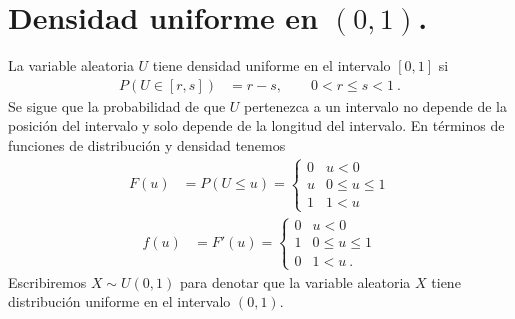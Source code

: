 \documentclass[12pt,reqno]{amsart}\usepackage[]{graphicx}\usepackage[]{color}
\begin{document}
\section{Densidad uniforme en $(0,1)$.}
La variable aleatoria $U$ tiene densidad uniforme en el intervalo $[0,1]$ si
\begin{equation*}
  \begin{split}
	P(U\in [r,s]) &= r - s,\qquad 0< r \leq s < 1 \:.
	\end{split}
\end{equation*}
Se sigue que la probabilidad de que $U$ pertenezca a un intervalo no depende de la posición del intervalo y solo depende de la longitud del intervalo. En términos de funciones de distribución y densidad tenemos
\begin{equation}\label{disUniforme}
  \begin{split}
  F(u) &= P(U \leq u) = \begin{cases}
           0 & u < 0\\
           u & 0\leq u \leq 1\\
           1 & 1 < u
	        \end{cases}
  \end{split}
\end{equation}
\begin{equation}\label{denUniforme}
  \begin{split}
  f(u) &=F'(u)= \begin{cases}
           0 & u < 0\\
           1 & 0\leq u \leq 1\\
           0 & 1 < u\:.
          \end{cases}
  \end{split}
\end{equation}
Escribiremos $X \sim U(0,1)$ para denotar que la variable aleatoria $X$ tiene distribución uniforme en el intervalo $(0,1)$. 
\end{document}
